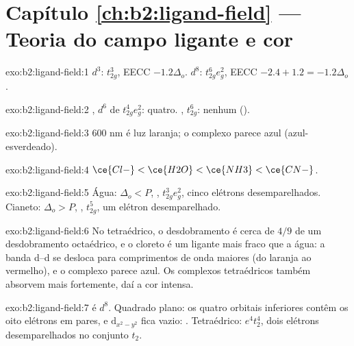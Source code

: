 \section*{Capítulo \ref{ch:b2:ligand-field} --- Teoria do campo ligante e cor}

\begin{solution}{exo:b2:ligand-field:1}
$d^3$: $t_{2g}^3$, EECC $-1.2\Delta_o$. $d^8$: $t_{2g}^6e_g^2$, EECC $-2.4 + 1.2 = -1.2\Delta_o$.
\end{solution}

\begin{solution}{exo:b2:ligand-field:2}
, $d^6$ de  $t_{2g}^4e_g^2$: quatro. , 
$t_{2g}^6$: nenhum ().
\end{solution}

\begin{solution}{exo:b2:ligand-field:3}
600 nm é luz laranja; o complexo parece azul (azul-esverdeado).
\end{solution}

\begin{solution}{exo:b2:ligand-field:4}
$\ce{Cl-} < \ce{H2O} < \ce{NH3} < \ce{CN-}$.
\end{solution}

\begin{solution}{exo:b2:ligand-field:5}
Água: $\Delta_o < P$, , $t_{2g}^3e_g^2$, cinco elétrons desemparelhados. Cianeto: $\Delta_o > P$,
, $t_{2g}^5$, um elétron desemparelhado.
\end{solution}

\begin{solution}{exo:b2:ligand-field:6}
No  tetraédrico, o desdobramento é cerca de $4/9$ de um
desdobramento octaédrico, e o cloreto é um ligante mais fraco que a água: a
banda d--d se desloca para comprimentos de onda maiores (do laranja ao
vermelho), e o complexo parece azul. Os complexos tetraédricos também absorvem
mais fortemente, daí a cor intensa.
\end{solution}

\begin{solution}{exo:b2:ligand-field:7}
 é $d^8$. Quadrado plano: os quatro orbitais inferiores contêm os oito
elétrons em pares, e $\mathrm d_{x^2-y^2}$ fica vazio: . Tetraédrico:
$e^4t_2^4$, dois elétrons desemparelhados no conjunto $t_2$.
\end{solution}

